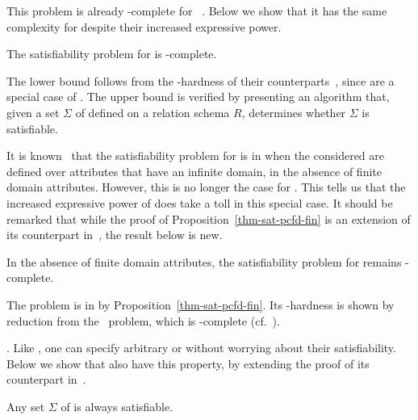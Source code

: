 This problem is already \NP-complete for \CFDs~\cite{CFDs}.
Below we show that it has the
same complexity for \pCFDs despite their increased
expressive power.

\begin{prop}
\label{thm-sat-pcfd-fin} The satisfiability problem for \pCFDs is
\NP-complete. \eop
\end{prop}
\vspace{-0.5ex}

\proofs The lower bound follows from the \NP-hardness of their \CFDs
counterparts~\cite{CFDs}, since \CFDs are a special case of \pCFDs.
The upper bound is verified by presenting an \NP algorithm that,
given a set $\Sigma$ of \pCFDs defined on a relation schema $R$,
determines whether $\Sigma$ is satisfiable. \eop \vspace{1ex}


It is known~\cite{CFDs} that the satisfiability problem for \CFDs is
in \PTIME when the \CFDs considered are defined over attributes that
have an infinite domain, \ie in the absence of finite domain
attributes. However, this is no longer the case for \pCFDs. This
tells us that the increased expressive power of \pCFDs does take a
toll in this special case. It should be remarked that while the
proof of Proposition~\ref{thm-sat-pcfd-fin} is an extension of its
counterpart in~\cite{CFDs}, the result below is new.


\begin{theorem}
\label{thm-sat-pcfd-infin} In the absence of finite domain
attributes, the satisfiability problem for \pCFDs remains
\NP-complete. \eop
\end{theorem}

\vspace{-0.5ex} \proofs The problem is in \NP by
Proposition~\ref{thm-sat-pcfd-fin}. Its \NP-hardness is shown by
reduction from the \kSAT\ problem, which is \NP-complete
(cf.~\cite{GaJo79}).\eop
\vspace{0.5ex}


. Like \FDs,
one can specify arbitrary \INDs or \CINDs without worrying about
their satisfiability. Below we show that \pCINDs also have this
property, by extending the proof of its counterpart in~\cite{CINDs}.

\begin{prop}
\label{thm-sat-pcind} Any set $\Sigma$ of \pCINDs is always
satisfiable. \eop
\end{prop}
\vspace{-1ex}

